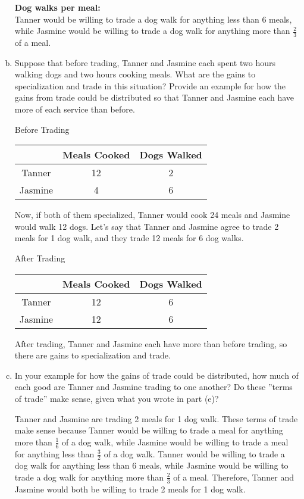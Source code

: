 \documentclass{article}
\begin{document}
\begin{enumerate}[(a)]
    \textbf{Dog walks per meal:}\\
    Tanner would be willing to trade a dog walk for anything less than 6 meals, while Jasmine would be willing to trade a dog walk for anything more than \(\frac{2}{3}\) of a meal.

    \item Suppose that before trading, Tanner and Jasmine each spent two
hours walking dogs and two hours cooking meals. What are the
gains to specialization and trade in this situation? Provide an
example for how the gains from trade could be distributed so
that Tanner and Jasmine each have more of each service than
before.

\begin{center}
    Before Trading\\
    \begin{tabular}{ |c|c|c| } 
     \hline
      & Meals Cooked & Dogs Walked \\ 
     \hline
    Tanner & 12 & 2 \\
    \hline
    Jasmine & 4 & 6 \\
    \hline
    \end{tabular}
\end{center}

Now, if both of them specialized, Tanner would cook 24 meals and Jasmine would walk 12 dogs. Let's say that Tanner and Jasmine agree to trade 2 meals for 1 dog walk, and they trade 12 meals for 6 dog walks. 

\begin{center}
    After Trading\\
    \begin{tabular}{ |c|c|c| } 
     \hline
      & Meals Cooked & Dogs Walked \\ 
     \hline
    Tanner & 12 & 6 \\
    \hline
    Jasmine & 12 & 6 \\
    \hline
    \end{tabular}
\end{center}

After trading, Tanner and Jasmine each have more than before trading, so there are gains to specialization and trade.
\pagebreak
    \item In your example for how the gains of trade could be distributed,
how much of each good are Tanner and Jasmine trading to one
another? Do these ”terms of trade” make sense, given what you
wrote in part (e)?

    Tanner and Jasmine are trading 2 meals for 1 dog walk. These terms of trade make sense because Tanner would be willing to trade a meal for anything more than \(\frac{1}{6}\) of a dog walk, while Jasmine would be willing to trade a meal for anything less than \(\frac{3}{2}\) of a dog walk. Tanner would be willing to trade a dog walk for anything less than 6 meals, while Jasmine would be willing to trade a dog walk for anything more than \(\frac{2}{3}\) of a meal. Therefore, Tanner and Jasmine would both be willing to trade 2 meals for 1 dog walk.
\end{enumerate}
\end{document}
